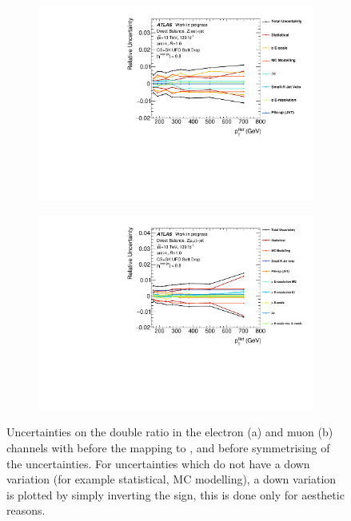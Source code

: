 \begin{figure}[t]
\centering
\begin{subfigure}[b]{\textwidth}
    \centering
    \includegraphics[width=\textwidth]{plots/insitu/unc_ptref_zee_WIP.pdf}
    \caption{\vspace{20pt}}
\end{subfigure}
\hfill
\begin{subfigure}[b]{\textwidth}
    \centering
    \includegraphics[width=\textwidth]{plots/insitu/unc_ptref_zmm_WIP.pdf}
    \caption{}
\end{subfigure}
\caption{Uncertainties on the double ratio in the electron (a) and muon (b) channels with \ptref before the mapping to \ptJ, and before symmetrising of the uncertainties. For uncertainties which do not have a down variation (for example statistical, MC modelling), a down variation is plotted by simply inverting the sign, this is done only for aesthetic reasons.\label{fig:insitu:ptrefsysts}}
\end{figure}

